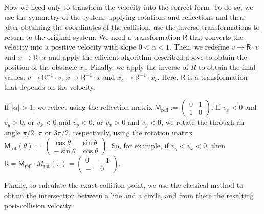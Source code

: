 \documentclass{iopart}
\begin{document}
Now we need only to transform the velocity into the correct form. To do so, we use the symmetry of the system, applying rotations and reflections and then, after obtaining the coordinates of the collision, use the inverse transformations to return to the original system. 
We need a transformation $\mathsf{R}$ that converts the velocity into a positive velocity with slope $0<\alpha<1$. Then, we redefine $v \rightarrow \mathsf{R} \cdot v$ and $x \rightarrow \mathsf{R} \cdot x$ and  apply the efficient algorithm described above to obtain the position of the obstacle $x_c$. Finally, we apply the inverse of $R$ to obtain the final values:  $v \rightarrow \mathsf{R}^{-1} \cdot v$, $x \rightarrow \mathsf{R}^{-1} \cdot x$ and $x_c \rightarrow \mathsf{R}^{-1} \cdot x_c$. Here, $\mathsf{R}$ is a transformation that depends on the velocity. 

If $|\alpha|>1$, we reflect using the reflection matrix
$\mathsf{M}_{\mathrm{refl}} := \left(\begin{array}{cc}
0 & 1\\
1 & 0
\end{array}\right)$.
If $v_x<0$ and $v_y>0$, or $v_x<0$ and $v_y<0$, or $v_x>0$ and $v_y<0$, we rotate the  through an angle $\pi/2$, $\pi$ or $3\pi/2$, respectively, using the rotation matrix 
$\mathsf{M}_\mathrm{rot}(\theta) := \left( \begin{array}{cc}
\cos \theta & \sin \theta\\
-\sin \theta & \cos \theta
\end{array} \right)$.
So, for example, if $v_y<v_x<0$, then $\mathsf{R} = 
\mathsf{M}_{\mathrm{refl}} \cdot M_{\mathrm{rot}}(\pi) = \left(\begin{array}{cc}
0 & -1\\
-1 & 0
\end{array}\right)$. 

Finally, to calculate the exact collision point, we use the classical method	 to obtain the intersection between a line and a circle, and from there the resulting post-collision velocity.
\end{document}
